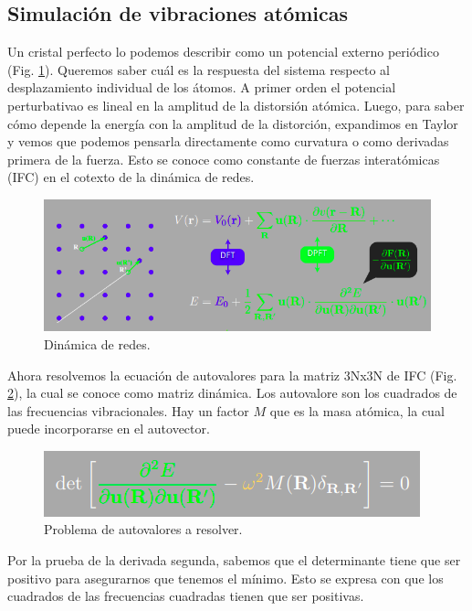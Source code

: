 \subsection{Simulación de vibraciones atómicas}

  Un cristal perfecto lo podemos describir como un potencial externo periódico (Fig. \ref{fig:red}). Queremos saber cuál es la respuesta del sistema respecto al desplazamiento individual de los átomos. A primer orden el potencial perturbativao es lineal en la amplitud de la distorsión atómica. Luego, para saber cómo depende la energía con la amplitud de la distorción, expandimos en Taylor y vemos que podemos pensarla directamente como curvatura o como derivadas primera de la fuerza. Esto se conoce como constante de fuerzas interatómicas (IFC) en el cotexto de la dinámica de redes.

  \begin{figure}[H]
      \centering
      \includegraphics[scale = 0.6]{figs/D5/red.png}
      \caption{Dinámica de redes.}
      \label{fig:red}
  \end{figure}

  Ahora resolvemos la ecuación de autovalores para la matriz 3Nx3N de IFC (Fig. \ref{fig:vib}), la cual se conoce como matriz dinámica. Los autovalore son los cuadrados de las frecuencias vibracionales. Hay un factor $M$ que es la masa atómica, la cual puede incorporarse en el autovector.

    \begin{figure}[H]
      \centering
      \includegraphics[scale = 0.6]{figs/D5/vibraciones.png}
      \caption{Problema de autovalores a resolver.}
      \label{fig:vib}
    \end{figure}

  Por la prueba de la derivada segunda, sabemos que el determinante tiene que ser positivo para asegurarnos que tenemos el mínimo. Esto se expresa con que los cuadrados de las frecuencias cuadradas tienen que ser positivas.

